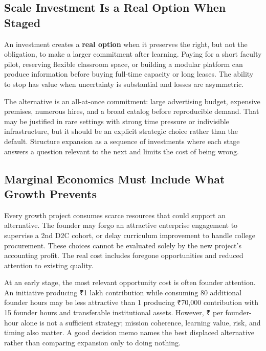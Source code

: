 \subsection{Scale Investment Is a Real Option When Staged}
\label{sec:real_options_in_scale}

An investment creates a \textbf{real option} when it preserves the right, but not the obligation, to make a larger commitment after learning. Paying for a short faculty pilot, reserving flexible classroom space, or building a modular platform can produce information before buying full-time capacity or long leases. The ability to stop has value when uncertainty is substantial and losses are asymmetric.

The alternative is an all-at-once commitment: large advertising budget, expensive premises, numerous hires, and a broad catalog before reproducible demand. That may be justified in rare settings with strong time pressure or indivisible infrastructure, but it should be an explicit strategic choice rather than the default. Structure expansion as a sequence of investments where each stage answers a question relevant to the next and limits the cost of being wrong.

\subsection{Marginal Economics Must Include What Growth Prevents}
\label{sec:opportunity_costs_of_growth}

Every growth project consumes scarce resources that could support an alternative. The founder may forgo an attractive enterprise engagement to supervise a 2nd D2C cohort, or delay curriculum improvement to handle college procurement. These choices cannot be evaluated solely by the new project's accounting profit. The real cost includes foregone opportunities and reduced attention to existing quality.

At an early stage, the most relevant opportunity cost is often founder attention. An initiative producing ₹1 lakh contribution while consuming 80 additional founder hours may be less attractive than 1 producing ₹70,000 contribution with 15 founder hours and transferable institutional assets. However, ₹ per founder-hour alone is not a sufficient strategy; mission coherence, learning value, risk, and timing also matter. A good decision memo names the best displaced alternative rather than comparing expansion only to doing nothing.
